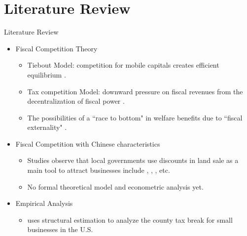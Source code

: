 \documentclass[xcolor={dvipsnames}]{beamer}
\theoremstyle{plain}
\begin{document}
\section{Literature Review}
\begin{frame}{Literature Review}
    \begin{itemize}

        \item Fiscal Competition Theory
              \begin{itemize}
                  \item Tiebout Model: competition for mobile capitals creates efficient equilibrium
                        \cite{tiebout1956pure}.
                  \item Tax competition Model: downward pressure on fiscal revenues
                        from the decentralization of fiscal power
                        \cite{keen1997fiscal}.
                  \item The possibilities of a ``race to bottom" in welfare benefits
                        due to ``fiscal externality" \cite{wilson1999theories}.
              \end{itemize}
        \item Fiscal Competition with Chinese characteristics
              \begin{itemize}
                  \item Studies observe that local governments use discounts in
                        land sale as a main tool
                        to attract businesses include ,
                        , , etc.
                  \item No formal theoretical model and econometric analysis yet.
              \end{itemize}
        \item Empirical Analysis
              \begin{itemize}
                  \item {} uses structural estimation to
                        analyze the county tax break for small businesses in the U.S.
              \end{itemize}
    \end{itemize}
\end{frame}

\end{document}
